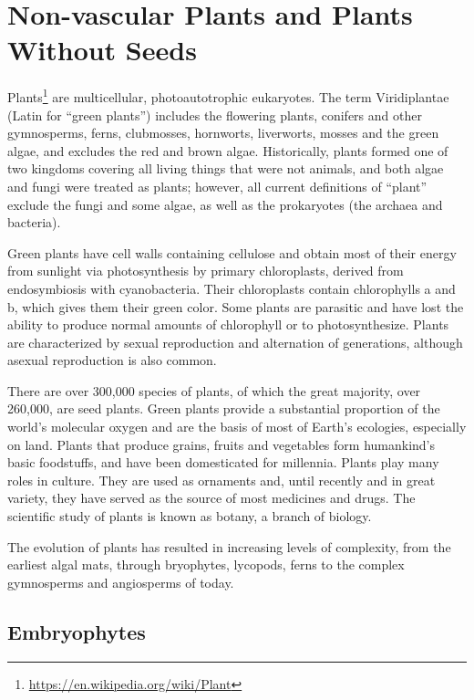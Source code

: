 \documentclass[]{book}
\let\rmarkdownfootnote\footnote%
\def\footnote{\protect\rmarkdownfootnote}
\renewcommand{\href}[2]{#2\footnote{\url{#1}}}
\theoremstyle{definition}
\theoremstyle{definition}
\theoremstyle{definition}
\theoremstyle{remark}
\begin{document}
\chapter{Non-vascular Plants and Plants Without
Seeds}\label{non-vascular-plants-and-plants-without-seeds}

\href{https://en.wikipedia.org/wiki/Plant}{Plants} are multicellular,
photoautotrophic eukaryotes. The term Viridiplantae (Latin for ``green
plants'') includes the flowering plants, conifers and other gymnosperms,
ferns, clubmosses, hornworts, liverworts, mosses and the green algae,
and excludes the red and brown algae. Historically, plants formed one of
two kingdoms covering all living things that were not animals, and both
algae and fungi were treated as plants; however, all current definitions
of ``plant'' exclude the fungi and some algae, as well as the
prokaryotes (the archaea and bacteria).

Green plants have cell walls containing cellulose and obtain most of
their energy from sunlight via photosynthesis by primary chloroplasts,
derived from endosymbiosis with cyanobacteria. Their chloroplasts
contain chlorophylls a and b, which gives them their green color. Some
plants are parasitic and have lost the ability to produce normal amounts
of chlorophyll or to photosynthesize. Plants are characterized by sexual
reproduction and alternation of generations, although asexual
reproduction is also common.

There are over 300,000 species of plants, of which the great majority,
over 260,000, are seed plants. Green plants provide a substantial
proportion of the world's molecular oxygen and are the basis of most of
Earth's ecologies, especially on land. Plants that produce grains,
fruits and vegetables form humankind's basic foodstuffs, and have been
domesticated for millennia. Plants play many roles in culture. They are
used as ornaments and, until recently and in great variety, they have
served as the source of most medicines and drugs. The scientific study
of plants is known as botany, a branch of biology.

The evolution of plants has resulted in increasing levels of complexity,
from the earliest algal mats, through bryophytes, lycopods, ferns to the
complex gymnosperms and angiosperms of today.

\section{Embryophytes}\label{embryophytes}
\end{document}
